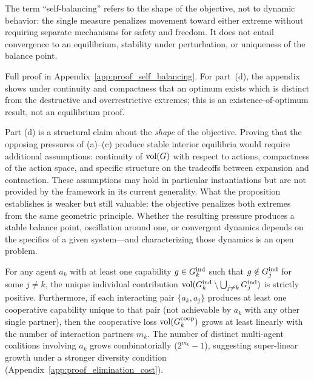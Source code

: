 The term ``self-balancing'' refers to the shape of the objective, not to
dynamic behavior: the single measure penalizes movement toward either extreme
without requiring separate mechanisms for safety and freedom. It does not
entail convergence to an equilibrium, stability under perturbation, or
uniqueness of the balance point.

Full proof in Appendix~\ref{app:proof_self_balancing}. For part~(d), the
appendix shows under continuity and compactness that an optimum exists which
is distinct from the destructive and overrestrictive extremes; this is an
existence-of-optimum result, not an equilibrium proof.

Part (d) is a structural claim about the \emph{shape} of the objective. Proving that the opposing pressures of (a)--(c) produce stable interior equilibria would require additional assumptions: continuity of $\operatorname{vol}(G)$ with respect to actions, compactness of the action space, and specific structure on the tradeoffs between expansion and contraction. These assumptions may hold in particular instantiations but are not provided by the framework in its current generality. What the proposition establishes is weaker but still valuable: the objective penalizes both extremes from the same geometric principle. Whether the resulting pressure produces a stable balance point, oscillation around one, or convergent dynamics depends on the specifics of a given system---and characterizing those dynamics is an open problem.


\begin{corollary}
\label{cor:elimination}
For any agent $a_k$ with at least one capability $g \in G_{k}^{\mathrm{ind}}$ such that $g
    \notin G_{j}^{\mathrm{ind}}$ for some $j \neq k$, the unique individual contribution
    $\operatorname{vol}(G_{k}^{\mathrm{ind}} \setminus \bigcup_{j \neq k} G_{j}^{\mathrm{ind}})$ is strictly
    positive. Furthermore, if each interacting pair $\{a_k, a_j\}$ produces at least one
    cooperative capability unique to that pair (not achievable by $a_k$ with
    any other single partner), then the cooperative loss
    $\operatorname{vol}(G^{\mathrm{coop}}_{k})$ grows at least linearly with the number of
    interaction partners $m_k$. The number of distinct multi-agent coalitions
    involving $a_k$ grows combinatorially ($2^{m_k} - 1$), suggesting
    super-linear growth under a stronger diversity condition
    (Appendix~\ref{app:proof_elimination_cost}).
\end{corollary}

